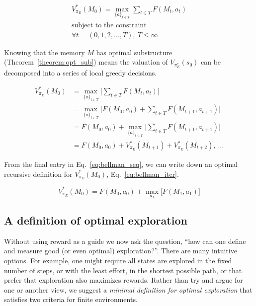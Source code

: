 \documentclass[9pt,twocolumn,twoside]{pnas-new}
\begin{document}
\begin{equation} \label{eq:V_star}
    \begin{split}
        V^*_{\pi_E}(M_0) = \max_{\{a\}_{t \in T}} \sum_{t \in T} F(M_t, a_t)\\
        \text{subject to the constraint}\\
        \forall t = (0,1,2,\ldots, T),\ T \leq \infty
    \end{split}
\end{equation}

Knowing that the memory $M$ has optimal substructure (Theorem~\ref{theorem:opt_sub}) means the valuation of $V_{\pi_E^*}(s_0)$ can be decomposed into a series of local greedy decisions.

\begin{equation} \label{eq:bellman_seq}
    \begin{split}
        V^*_{\pi_E}(M_0) &= \max_{\{a\}_{t \in T}} \Big [\sum_{t \in T} F(M_t, a_t)\Big ]\\
                         &= \max_{\{a\}_{t \in T}} \Big [F(M_0, a_0) + \sum_{t \in T}F(M_{t+1}, a_{t+1})\Big ]\\
                         &= F(M_0, a_0) + \max_{\{a\}_{t \in T}} \Big [\sum_{t \in T} F(M_{t+1}, a_{t+1}) \Big ]\\
                         &= F(M_0, a_0) + V^*_{\pi_E}(M_{t+1}) + V^*_{\pi_E}(M_{t+2}),\ \ldots
    \end{split}
\end{equation}

From the final entry in Eq.~\ref{eq:bellman_seq}, we can write down an optimal recursive definition for $V^*_{\pi_E}(M_0)$, Eq.~\ref{eq:bellman_iter}.

\begin{equation} \label{eq:bellman_iter}
    V^*_{\pi_E}(M_0) = F(M_0, a_0) + \max_{a_1} \Big [F(M_1, a_1) \Big ]
\end{equation}
    

\subsection*{A definition of optimal exploration}
Without using reward as a guide we now ask the question, ``how can one define and measure good (or even optimal) exploration?''. There are many intuitive options. For example, one might require all states are explored in the fixed number of steps, or with the least effort, in the shortest possible path, or that prefer that exploration also maximizes rewards. Rather than try and argue for one or another view, we suggest a \textit{minimal definition for optimal exploration} that satisfies two criteria for finite environments. 
\end{document}

